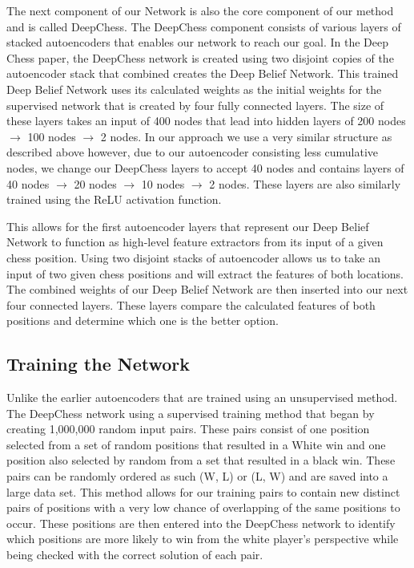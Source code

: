 \documentclass[12pt]{article}
\begin{document}
    The next component of our Network is also the core component of our method and is called DeepChess. The DeepChess component consists of various layers of stacked autoencoders that enables our network to reach our goal. In the Deep Chess paper, the DeepChess network is created using two disjoint copies of the autoencoder stack that combined creates the Deep Belief Network. This trained Deep Belief Network uses its calculated weights as the initial weights for the supervised network that is created by four fully connected layers. The size of these layers takes an input of 400 nodes that lead into hidden layers of 200 nodes $\rightarrow$ 100 nodes $\rightarrow$ 2 nodes. In our approach we use a very similar structure as described above however, due to our autoencoder consisting less cumulative nodes, we change our DeepChess layers to accept 40 nodes and contains layers of 40 nodes $\rightarrow$ 20 nodes $\rightarrow$ 10 nodes $\rightarrow$ 2 nodes. These layers are also similarly trained using the ReLU activation function.

    This allows for the first autoencoder layers that represent our Deep Belief Network to function as high-level feature extractors from its input of a given chess position. Using two disjoint stacks of autoencoder allows us to take an input of two given chess positions and will extract the features of both locations. The combined weights of our Deep Belief Network are then inserted into our next four connected layers. These layers compare the calculated features of both positions and determine which one is the better option. 

    \subsection{Training the Network}

    Unlike the earlier autoencoders that are trained using an unsupervised method. The DeepChess network using a supervised training method that began by creating 1,000,000 random input pairs. These pairs consist of one position selected from a set of random positions that resulted in a White win and one position also selected by random from a set that resulted in a black win. These pairs can be randomly ordered as such (W, L) or (L, W) and are saved into a large data set. This method allows for our training pairs to contain new distinct pairs of positions with a very low chance of overlapping of the same positions to occur. These positions are then entered into the DeepChess network to identify which positions are more likely to win from the white player's perspective while being checked with the correct solution of each pair.  
\end{document}
